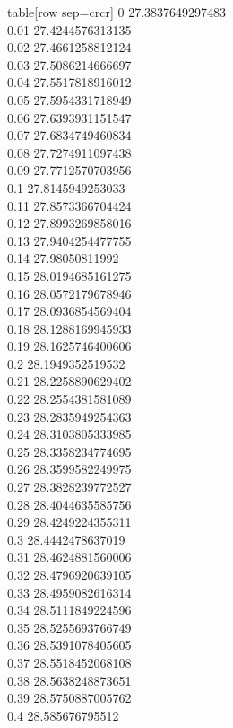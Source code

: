   table[row sep=crcr]{%
0	27.3837649297483\\
0.01	27.4244576313135\\
0.02	27.4661258812124\\
0.03	27.5086214666697\\
0.04	27.5517818916012\\
0.05	27.5954331718949\\
0.06	27.6393931151547\\
0.07	27.6834749460834\\
0.08	27.7274911097438\\
0.09	27.7712570703956\\
0.1	27.8145949253033\\
0.11	27.8573366704424\\
0.12	27.8993269858016\\
0.13	27.9404254477755\\
0.14	27.98050811992\\
0.15	28.0194685161275\\
0.16	28.0572179678946\\
0.17	28.0936854569404\\
0.18	28.1288169945933\\
0.19	28.1625746400606\\
0.2	28.1949352519532\\
0.21	28.2258890629402\\
0.22	28.2554381581089\\
0.23	28.2835949254363\\
0.24	28.3103805333985\\
0.25	28.3358234774695\\
0.26	28.3599582249975\\
0.27	28.3828239772527\\
0.28	28.4044635585756\\
0.29	28.4249224355311\\
0.3	28.4442478637019\\
0.31	28.4624881560006\\
0.32	28.4796920639105\\
0.33	28.4959082616314\\
0.34	28.5111849224596\\
0.35	28.5255693766749\\
0.36	28.5391078405605\\
0.37	28.5518452068108\\
0.38	28.5638248873651\\
0.39	28.5750887005762\\
0.4	28.585676795512\\
}
